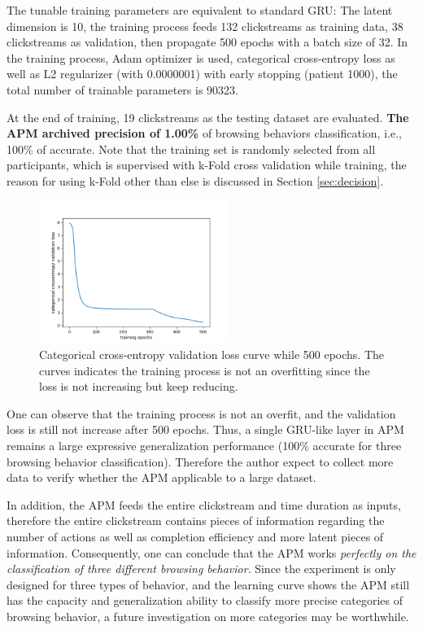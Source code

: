 The tunable training parameters are equivalent to standard GRU: 
The latent dimension is 10, the training process feeds 132 clickstreams as training data,
38 clickstreams as validation, then propagate 500 epochs with a batch size of 32. 
In the training process, Adam optimizer is used,
 categorical cross-entropy loss as well as L2 regularizer (with 0.0000001) with early stopping (patient 1000),
the total number of trainable parameters is 90323.

At the end of training, 19 clickstreams as the testing dataset are evaluated. 
\textbf{The APM archived precision of 1.00\%} of browsing behaviors classification, i.e., 100\% of accurate.
Note that the training set is randomly selected from all participants, which is supervised
with k-Fold cross validation \cite{kohavi1995study} while training, the reason for
using k-Fold other than else is discussed in Section \ref{sec:decision}.

\begin{figure}[H]
    \centering
    \includegraphics[width=0.55\textwidth]{figures/class-loss}
    \caption{Categorical cross-entropy validation loss curve while 500 epochs. 
    The curves indicates the training process is not an overfitting since the loss is not increasing but keep reducing.}
    \label{fig:class-loss}
\end{figure}

One can observe that the training process is not an overfit, and the validation loss is 
still not increase after 500 epochs. Thus, a single GRU-like layer in APM 
remains a large expressive generalization performance 
(100\% accurate for three browsing behavior classification). Therefore
the author expect to collect more data to verify whether the APM applicable to a large dataset.

In addition, the APM feeds the entire clickstream and time duration as inputs, 
therefore the entire clickstream contains pieces of information regarding the number of actions
as well as completion efficiency and more latent pieces of information. 
Consequently, one can conclude that the APM works
\emph{perfectly on the classification of three different browsing behavior}. 
Since the experiment is only designed for three types of behavior, and the learning curve
shows the APM still has the capacity and generalization ability to 
classify more precise categories of browsing behavior, a future investigation on
more categories may be worthwhile.

